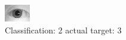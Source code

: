 \begin{figure}[h!]
\begin{center}
\includegraphics[width=0.60\columnwidth]{figures/ID1047_class_2_target_3.png}
\end{center}
\caption{ Classification: 2 actual target: 3}
\label{fig:ID1047_class_2_target_3}
\end{figure}
